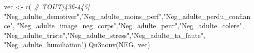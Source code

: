 \documentclass[
]{article}
\newenvironment{Shaded}{\begin{snugshade}}{\end{snugshade}}
\newcommand{\CommentTok}[1]{\textcolor[rgb]{0.56,0.35,0.01}{\textit{#1}}}
\newcommand{\FunctionTok}[1]{\textcolor[rgb]{0.00,0.00,0.00}{#1}}
\newcommand{\NormalTok}[1]{#1}
\newcommand{\OtherTok}[1]{\textcolor[rgb]{0.56,0.35,0.01}{#1}}
\newcommand{\StringTok}[1]{\textcolor[rgb]{0.31,0.60,0.02}{#1}}
\begin{document}
\begin{Shaded}
\begin{Highlighting}[]
\NormalTok{vec }\OtherTok{\textless{}{-}} \FunctionTok{c}\NormalTok{(   }\CommentTok{\# TOUT[436{-}445]}
  \StringTok{"Neg\_adulte\_demotiver"}\NormalTok{,}\StringTok{"Neg\_adulte\_moins\_perf"}\NormalTok{,}\StringTok{"Neg\_adulte\_perdu\_confiance"}\NormalTok{,}
  \StringTok{"Neg\_adulte\_image\_neg\_corps"}\NormalTok{,}\StringTok{"Neg\_adulte\_peur"}\NormalTok{,}\StringTok{"Neg\_adulte\_colere"}\NormalTok{,}
  \StringTok{"Neg\_adulte\_triste"}\NormalTok{,}\StringTok{"Neg\_adulte\_stress"}\NormalTok{,}\StringTok{"Neg\_adulte\_ta\_faute"}\NormalTok{,}
  \StringTok{"Neg\_adulte\_humiliation"}\NormalTok{)}
\FunctionTok{Qu3nouv}\NormalTok{(NEG, vec)}
\end{Highlighting}
\end{Shaded}
\end{document}
